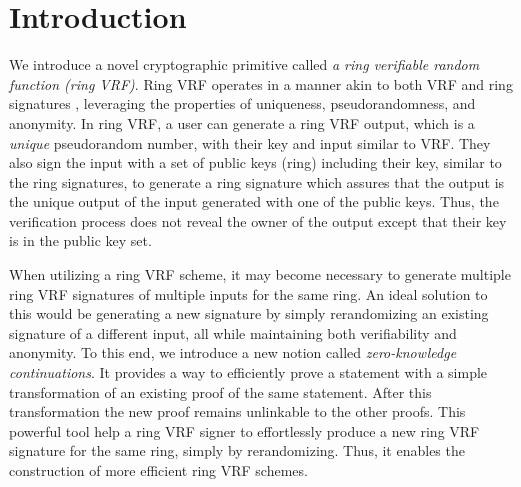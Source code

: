 \section{Introduction}

We introduce a novel cryptographic primitive called \emph{a ring verifiable random function (ring VRF)}. Ring VRF  operates in a manner akin to both VRF \cite{vrf_micali}  and ring signatures \cite{ring_accountable,ring_efficient,ring_linkable,ring_noRO,ring_sublinear}, leveraging the properties of uniqueness, pseudorandomness, and anonymity. In ring VRF, a user can generate a ring VRF output, which is a \emph{unique} pseudorandom number, with their key and  input  similar to VRF. They also sign the input with a set of public keys  (ring) including their key, similar to the ring signatures, to generate a ring signature which assures that the output is the unique output of the input generated with one of the public keys. Thus, the verification process does not reveal the owner of the  output except that their key is in the public key set.


When utilizing a ring VRF scheme, it may become necessary to generate multiple ring VRF signatures of multiple inputs for the same ring. An ideal solution to this would be generating a new signature by simply rerandomizing an existing signature of a different input, all while maintaining both verifiability and anonymity.
To this end, we introduce a  new notion called \emph{zero-knowledge continuations}. It provides a way to efficiently prove a statement with a simple transformation of an existing proof of the same statement. After this transformation the new proof remains unlinkable to the other proofs. This powerful tool help a ring VRF signer to effortlessly produce a new ring VRF signature for the same ring, simply by rerandomizing. Thus, it enables the construction of more efficient ring VRF schemes.

